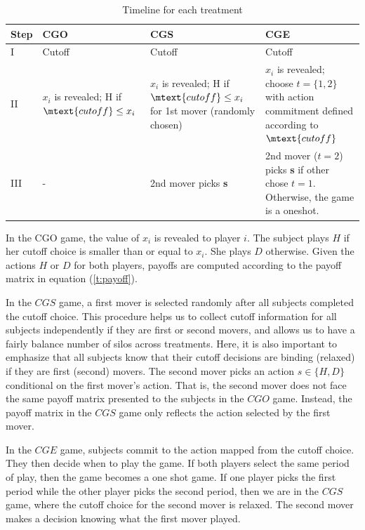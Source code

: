 \documentclass[12pt,english]{article}
\begin{document}
\begin{table}[ht]
\begin{center}
\begin{tabular}{l|m{2.4cm}|m{3.5cm}|m{4cm}}
  Step & CGO & CGS & CGE\\
  \hline 
I & Cutoff & Cutoff & Cutoff \\
\hline
II& $x_i$ is revealed; H if $\mtext{cutoff}\leq x_i$ & $x_i$ is revealed; H if $\mtext{cutoff}\leq x_i$ for 1st mover (randomly chosen)
& $x_i$ is revealed; choose $t=\{1,2\}$ with action commitment defined according to $\mtext{cutoff}$\\
\hline
III & - & 2nd mover picks \textbf{s} & 2nd mover ($t=2$) picks \textbf{s} if other chose $t=1$. Otherwise, the game is a oneshot.

\end{tabular}
\end{center}
\caption{Timeline for each treatment}
\label{table:time}
\end{table}

In the CGO game, the value of $x_i$ is revealed to player $i$. The subject plays $H$ if her cutoff choice is smaller than or equal to $x_i$. She plays $D$ otherwise. Given the actions $H$ or $D$ for both players, payoffs are computed according to the payoff matrix in equation (\ref{t:payoff}). 

In the $CGS$ game, a first mover is selected randomly after all subjects completed the cutoff choice. This procedure helps us to collect cutoff information for all subjects independently if they are first or second movers, and allows us to have a fairly balance number of silos across treatments. Here, it is also important to emphasize that all subjects know that their cutoff decisions are binding (relaxed) if they are first (second) movers. The second mover picks an action $s\in\{H,D\}$ conditional on the first mover's action. That is, the second mover does not face the same payoff matrix presented to the subjects in the $CGO $ game. Instead, the payoff matrix in the $CGS$ game only reflects the action selected by the first mover. 

In the $CGE$ game, subjects commit to the action mapped from the cutoff choice. They then decide when to play the game. If both players select the same period of play, then the game becomes a one shot game. If one player picks the first period while the other player picks the second period, then we are in the $CGS$ game, where the cutoff choice for the second mover is relaxed. The second mover makes a decision knowing what the first mover played. 
\end{document}
